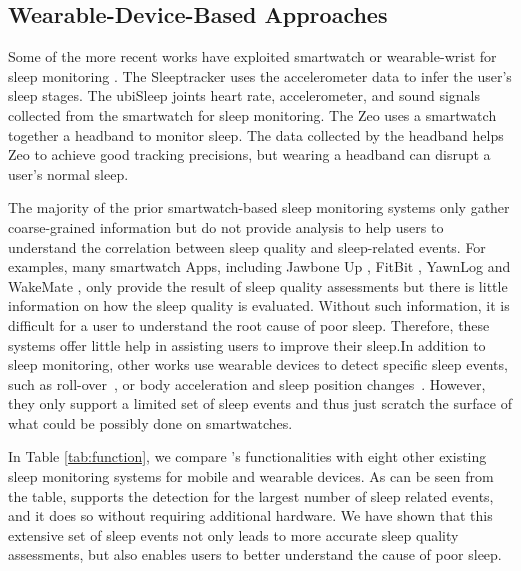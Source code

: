\subsection{Wearable-Device-Based Approaches}
Some of the more recent works have exploited smartwatch or wearable-wrist for sleep
 monitoring \cite{bain2003evaluation,bonnet2003insomnia,pombo2016ubisleep,caviness1996myoclonus}. The Sleeptracker \cite{sleeptracker} uses the accelerometer data to infer the user's sleep stages. The ubiSleep \cite{pombo2016ubisleep} joints heart rate, accelerometer, and sound signals collected from the smartwatch for
 sleep monitoring. The Zeo \cite{caviness1996myoclonus} uses a smartwatch together a headband to monitor sleep. The data collected by the headband helps Zeo to achieve good tracking precisions, but wearing a headband can disrupt a user's normal sleep.

The majority of the prior smartwatch-based sleep monitoring systems only gather coarse-grained information but do not provide analysis to
help users to understand the correlation between sleep quality and sleep-related events. For examples, many smartwatch Apps, including
Jawbone Up \cite{Jawbone}, FitBit \cite{fitbit}, YawnLog \cite{YawnLog} and WakeMate \cite{WakeMate}, only provide the result of sleep
quality assessments but there is little information on how the sleep quality is evaluated. Without such information, it is difficult for a
user to understand the root cause of poor sleep. Therefore, these systems offer little help in assisting users to improve their sleep.In
addition to sleep monitoring, other works use wearable devices to detect specific sleep events, such as roll-over~\cite{wear_related2}, or
body acceleration and sleep position changes~\cite{wear_related3}. However, they only support a limited set of sleep events and thus just
scratch the surface of what could be possibly done on smartwatches.



In Table \ref{tab:function}, we compare {\systemname}'s functionalities with eight other existing sleep monitoring systems for mobile and
wearable devices. As can be seen from the table, {\systemname} supports the detection for the largest number of sleep related events, and
it does so without requiring additional hardware. We have shown that this extensive set of sleep events not only leads to more accurate
sleep quality assessments, but also enables users to better understand the cause of poor sleep.



